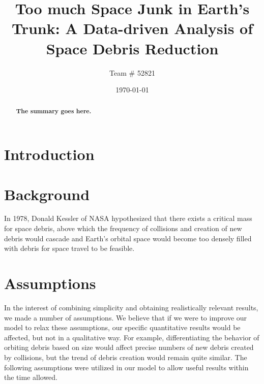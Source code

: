 \documentclass[pre,12pt]{revtex4-1}
\begin{document}
\title{\textbf{Too much Space Junk in Earth's Trunk: A Data-driven Analysis of Space Debris Reduction}}
\author{Team \# 52821}
\date{\today}

\begin{abstract}

\textbf{The summary goes here.} \\



\end{abstract}
\maketitle

\newpage
\section{Introduction}\label{Introduction}



\section{Background}\label{Background}

In 1978, Donald Kessler of NASA hypothesized that there exists a critical mass for space debris, above which the frequency of collisions and creation of new debris would cascade and Earth's orbital space would become too densely filled with debris for space travel to be feasible.

\section{Assumptions}\label{Assumptions}

In the interest of combining simplicity and obtaining realistically relevant results, we made a number of assumptions. We believe that if we were to improve our model to relax these assumptions, our specific quantitative results would be affected, but not in a qualitative way. For example, differentiating the behavior of orbiting debris based on size would affect precise numbers of new debris created by collisions, but the trend of debris creation would remain quite similar. The following assumptions were utilized in our model to allow useful results within the time allowed.
\end{document}
